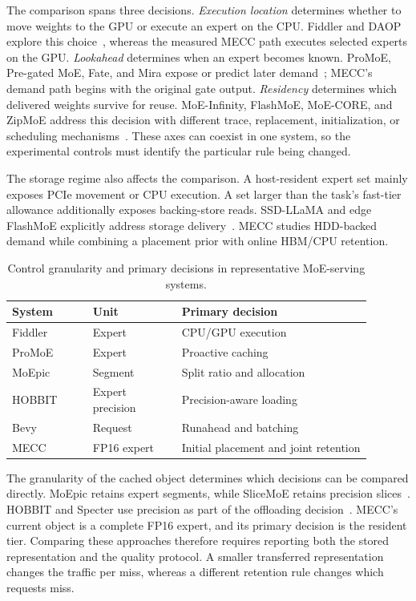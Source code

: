 \documentclass[conference,9pt,letterpaper]{IEEEtran}
\begin{document}
The comparison spans three decisions. \emph{Execution location} determines whether to move weights to the GPU or execute an expert on the CPU. Fiddler and DAOP explore this choice~\cite{fiddler,daop}, whereas the measured MECC path executes selected experts on the GPU. \emph{Lookahead} determines when an expert becomes known. ProMoE, Pre-gated MoE, Fate, and Mira expose or predict later demand~\cite{promoe,pregated,fate,mira}; MECC's demand path begins with the original gate output. \emph{Residency} determines which delivered weights survive for reuse. MoE-Infinity, FlashMoE, MoE-CORE, and ZipMoE address this decision with different trace, replacement, initialization, or scheduling mechanisms~\cite{moeinfinity,flashmoe,core,zipmoe}. These axes can coexist in one system, so the experimental controls must identify the particular rule being changed.

The storage regime also affects the comparison. A host-resident expert set mainly exposes PCIe movement or CPU execution. A set larger than the task's fast-tier allowance additionally exposes backing-store reads. SSD-LLaMA and edge FlashMoE explicitly address storage delivery~\cite{ssdllama,flashmoe}. MECC studies HDD-backed demand while combining a placement prior with online HBM/CPU retention.

\begin{table}[H]
\centering\small
\caption{Control granularity and primary decisions in representative MoE-serving systems.}
\label{tab:related_units}
\begin{tabular}{@{}p{0.20\linewidth}p{0.22\linewidth}p{0.47\linewidth}@{}}
\toprule
System & Unit & Primary decision\\
\midrule
Fiddler~\cite{fiddler} & Expert & CPU/GPU execution\\
ProMoE~\cite{promoe} & Expert & Proactive caching\\
MoEpic~\cite{moepic} & Segment & Split ratio and allocation\\
HOBBIT~\cite{hobbit} & Expert precision & Precision-aware loading\\
Bevy~\cite{bevy} & Request & Runahead and batching\\
MECC & FP16 expert & Initial placement and joint retention\\
\bottomrule
\end{tabular}
\end{table}

The granularity of the cached object determines which decisions can be compared directly. MoEpic retains expert segments, while SliceMoE retains precision slices~\cite{moepic,slicemoe}. HOBBIT and Specter use precision as part of the offloading decision~\cite{hobbit,specter}. MECC's current object is a complete FP16 expert, and its primary decision is the resident tier. Comparing these approaches therefore requires reporting both the stored representation and the quality protocol. A smaller transferred representation changes the traffic per miss, whereas a different retention rule changes which requests miss.
\end{document}
